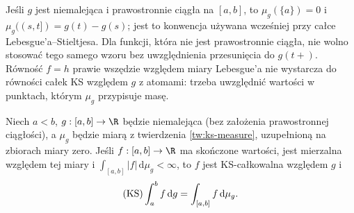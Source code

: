 \begin{uwaga}
Jeśli $g$ jest niemalejąca i prawostronnie ciągła na $[a,b]$, to $\mu_g(\{a\})=0$ i $\mu_g((s,t])=g(t)-g(s)$; jest to konwencja używana wcześniej przy całce Lebesgue'a--Stieltjesa. Dla funkcji, która nie jest prawostronnie ciągła, nie wolno stosować tego samego wzoru bez uwzględnienia przesunięcia do $g(t+)$. Równość $f=h$ prawie wszędzie względem miary Lebesgue'a nie wystarcza do równości całek KS względem $g$ z atomami: trzeba uwzględnić wartości w punktach, którym $\mu_g$ przypisuje masę.
\end{uwaga}

\begin{twierdzenie}\label{ma1:kh:thm:ks-positive-measure-l1}
Niech $a<b$, $g:[a,b]\to\R$ będzie niemalejąca (bez założenia prawostronnej ciągłości), a $\mu_g$ będzie miarą z twierdzenia \ref{tw:ks-measure}, uzupełnioną na zbiorach miary zero. Jeśli $f:[a,b]\to\R$ ma skończone wartości, jest mierzalna względem tej miary i $\int_{[a,b]}|f|\,\mathrm d\mu_g<\infty$, to $f$ jest KS-całkowalna względem $g$ i
\[
 (\mathrm{KS})\int_a^b f\,\mathrm dg=\int_{[a,b]} f\,\mathrm d\mu_g.
\]
\end{twierdzenie}
